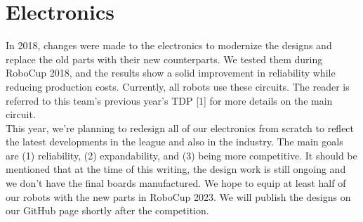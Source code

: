 \documentclass[runningheads]{llncs}
\begin{document}

\section{Electronics}

In 2018, changes were made to the electronics to modernize the designs and replace the old parts with their new counterparts. We tested them during RoboCup 2018, and the results show a solid improvement in reliability while reducing production costs. Currently, all robots use these circuits. The reader is referred to this team's previous year's TDP [1] for more details on the main circuit.\\
\indent This year, we're planning to redesign all of our electronics from scratch to reflect the latest developments in the league and also in the industry. The main goals are (1) reliability, (2) expandability, and (3) being more competitive. It should be mentioned that at the time of this writing, the design work is still ongoing and we don't have the final boards manufactured. We hope to equip at least half of our robots with the new parts in RoboCup 2023. We will publish the designs on our GitHub page shortly after the competition.
\end{document}
